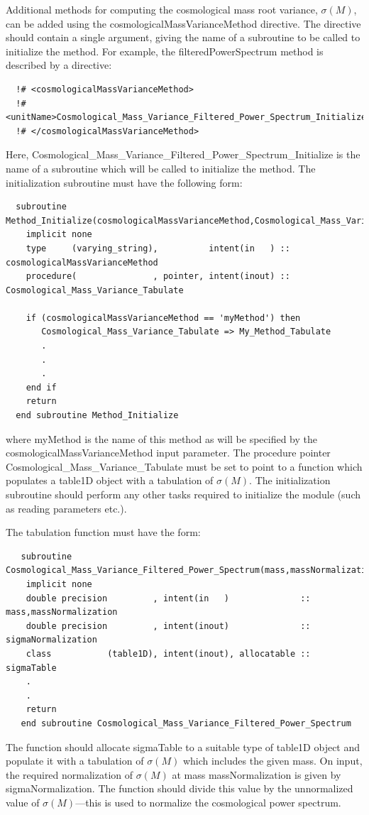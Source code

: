 Additional methods for computing the cosmological mass root variance, $\sigma(M)$, can be added using the {\normalfont \ttfamily cosmologicalMassVarianceMethod} directive. The directive should contain a single argument, giving the name of a subroutine to be called to initialize the method. For example, the {\normalfont \ttfamily filteredPowerSpectrum} method is described by a directive:
\begin{verbatim}
  !# <cosmologicalMassVarianceMethod>
  !#  <unitName>Cosmological_Mass_Variance_Filtered_Power_Spectrum_Initialize</unitName>
  !# </cosmologicalMassVarianceMethod>
\end{verbatim}
Here, {\normalfont \ttfamily Cosmological\_Mass\_Variance\_Filtered\_Power\_Spectrum\_Initialize} is the name of a subroutine which will be called to initialize the method. The initialization subroutine must have the following form:
\begin{verbatim}
  subroutine Method_Initialize(cosmologicalMassVarianceMethod,Cosmological_Mass_Variance_Tabulate)
    implicit none
    type     (varying_string),          intent(in   ) :: cosmologicalMassVarianceMethod
    procedure(               , pointer, intent(inout) :: Cosmological_Mass_Variance_Tabulate
    
    if (cosmologicalMassVarianceMethod == 'myMethod') then
       Cosmological_Mass_Variance_Tabulate => My_Method_Tabulate
       .
       .
       .
    end if
    return
  end subroutine Method_Initialize
\end{verbatim}
where {\normalfont \ttfamily myMethod} is the name of this method as will be specified by the {\normalfont \ttfamily cosmologicalMassVarianceMethod} input parameter. The procedure pointer {\normalfont \ttfamily Cosmological\_Mass\_Variance\_Tabulate} must be set to point to a function which populates a {\normalfont \ttfamily table1D} object with a tabulation of $\sigma(M)$. The initialization subroutine should perform any other tasks required to initialize the module (such as reading parameters etc.).

The tabulation function must have the form:
\begin{verbatim}
   subroutine Cosmological_Mass_Variance_Filtered_Power_Spectrum(mass,massNormalization,sigmaNormalization,sigmaTable)
    implicit none
    double precision         , intent(in   )              :: mass,massNormalization
    double precision         , intent(inout)              :: sigmaNormalization
    class           (table1D), intent(inout), allocatable :: sigmaTable
    .
    .
    return
   end subroutine Cosmological_Mass_Variance_Filtered_Power_Spectrum
\end{verbatim}
The function should allocate {\normalfont \ttfamily sigmaTable} to a suitable type of {\normalfont \ttfamily table1D} object and populate it with a tabulation of $\sigma(M)$ which includes the given {\normalfont \ttfamily mass}. On input, the required normalization of $\sigma(M)$ at mass {\normalfont \ttfamily massNormalization} is given by {\normalfont \ttfamily sigmaNormalization}. The function should divide this value by the unnormalized value of $\sigma(M)$---this is used to normalize the cosmological power spectrum.

